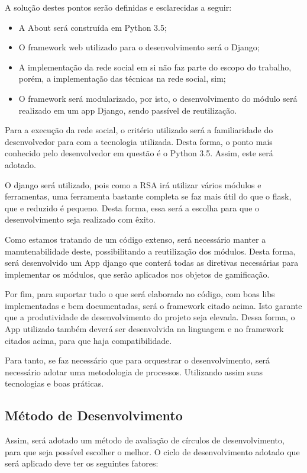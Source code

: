 A solução destes pontos serão definidas e esclarecidas a seguir:

\begin{itemize}
    \item A About será construída em Python 3.5;
    \item  O framework web utilizado para o desenvolvimento será o Django;
    \item A implementação da rede social em si não faz parte do escopo do trabalho, porém, a implementação
        das técnicas na rede social, sim;
    \item O framework será modularizado, por isto, o desenvolvimento do módulo será realizado em um app
        Django, sendo passível de reutilização.
\end{itemize}

Para a execução da rede social, o critério utilizado será a familiaridade do desenvolvedor para com a tecnologia
utilizada. Desta forma, o  ponto mais conhecido pelo desenvolvedor em questão é o Python 3.5. Assim, este será adotado.

O django será utilizado, pois como a RSA irá utilizar vários módulos e ferramentas, uma ferramenta  bastante completa
se faz mais útil do que o flask, que e reduzido é pequeno. Desta forma, essa será a escolha para que o desenvolvimento seja
realizado com êxito.

Como estamos tratando de um código extenso, será necessário manter a manutenabilidade deste, possibilitando a reutilização dos
módulos. Desta forma, será desenvolvido um App django que conterá todas as diretivas necessárias para implementar os módulos, que serão aplicados
nos objetos de gamificação.

Por fim, para suportar tudo o que será elaborado no código, com boas libs implementadas e bem documentadas, será o framework citado
acima. Isto garante que a produtividade de desenvolvimento do projeto seja elevada. Dessa forma, o App utilizado também deverá ser
desenvolvida na linguagem e no framework citados acima, para que haja compatibilidade.

Para tanto, se faz necessário que para orquestrar o desenvolvimento, será necessário adotar uma metodologia de processos. Utilizando 
assim suas tecnologias e boas práticas.

\subsection{Método de Desenvolvimento}
\label{sub:m_todo_de_desenvolvimento}
Assim, será adotado um método de avaliação de círculos de desenvolvimento, para que seja possível escolher o melhor.
O ciclo de desenvolvimento adotado que será aplicado deve ter os seguintes fatores:

